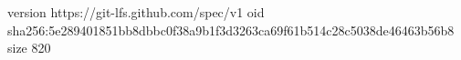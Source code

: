 version https://git-lfs.github.com/spec/v1
oid sha256:5e289401851bb8dbbc0f38a9b1f3d3263ca69f61b514c28c5038de46463b56b8
size 820
